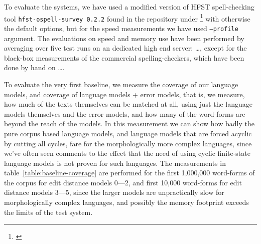 \documentclass[a4paper,12pt]{article}
\begin{document}
To evaluate the systems, we have used a modified version of HFST spell-checking
tool \texttt{hfst-ospell-survey 0.2.2} found in the repository under
\footnote{\url{}} with otherwise the default
options, but for the speed measurements we have used \texttt{--profile} argument.
The evaluations on speed and memory use have been performed by averaging over
five test runs on an dedicated high end server: \ldots, except for the
black-box measurements of the commercial spelling-checkers, which have been done by
hand on \ldots.

To evaluate the very first baseline, we measure the coverage of our language
models, and coverage of language models + error models, that is, we measure,
how much of the texts themselves can be matched at all, using just the language
models themselves and the error models, and how many of the word-forms are
beyond the reach of the models. In this measurement we can show how badly the
pure corpus based language models, and language models that are forced acyclic
by cutting all cycles, fare for the morphologically more complex languages, since
we've often seen comments to the effect that the
need of using cyclic finite-state language models is not proven for such languages. The
measurements in table~\ref{table:baseline-coverage} are performed for the
first 1,000,000 word-forms of the corpus for edit distance models 0---2, and
first 10,000 word-forms for edit distance models 3---5, since the larger
models are unpractically slow for morphologically complex languages, and
possibly the memory footprint exceeds the limits of the test system.
\end{document}
